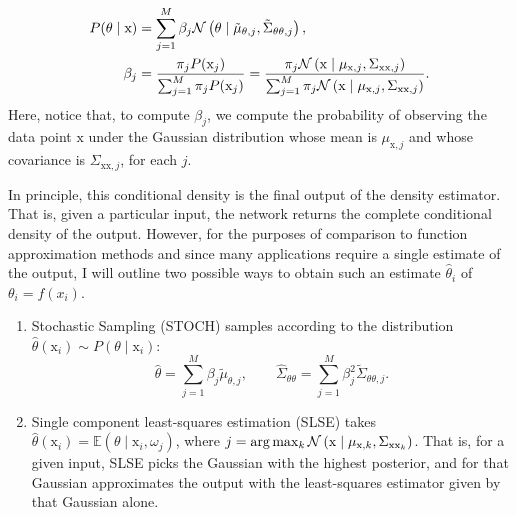 %
\begin{align}
    \begin{split}
    P(\theta \mid \mathrm{x}) &= \sum_{j=1}^M \beta_j \mathcal{N}\left(\theta \mid \tilde{\mu}_{\theta,j}, \tilde{\Sigma}_{\theta\theta,j} \right), \\
    \beta_j &= \frac{\pi_j P(\mathrm{x}_j)}{\sum_{j=1}^M \pi_j P(\mathrm{x}_j)} = 
    \frac{\pi_j \mathcal{N}\left(\mathrm{x} \mid {\mu}_{\mathrm{x},j}, {\Sigma}_{\mathrm{xx},j} \right)}
    {\sum_{j=1}^M \pi_j \mathcal{N}\left(\mathrm{x} \mid {\mu}_{\mathrm{x},j}, {\Sigma}_{\mathrm{xx},j} \right)}.
    \end{split}
    \label{eq:posterior_distribution}
\end{align}
%
Here, notice that, to compute $\beta_j$, we compute the probability of observing
the data point $\mathrm{x}$ under the Gaussian distribution whose mean is
$\mu_{\mathrm{x},j}$ and whose covariance is $\Sigma_{\mathrm{xx},j}$, for each
$j$.


In principle, this conditional density is the final output of the density
estimator. That is, given a particular input, the network returns the complete
conditional density of the output. However, for the purposes of comparison to
function approximation methods and since many applications require a single
estimate of the output, I will outline two possible ways to obtain such an
estimate $\hat{\theta}_i$ of $\theta_i = f(x_i)$.

\begin{enumerate}
    \item Stochastic Sampling (STOCH) samples according to the distribution
    $\hat{\theta}(\mathrm{x}_i) \sim P(\theta \mid \mathrm{x}_i)$:
    \begin{equation*}
        \hat{\theta} = \sum_{j=1}^M \beta_j \tilde{\mu}_{\theta,j}, \qquad
        \hat{\Sigma}_{\theta\theta} = \sum_{j=1}^M \beta_j^2 \tilde{\Sigma}_{\theta\theta,j}.
    \end{equation*}
    \item Single component least-squares estimation (SLSE) takes
    $\hat{\theta}(\mathrm{x}_i) = \mathbb{E}\left( \theta \mid \mathrm{x}_i,
    \omega_j \right)$, where $j = \arg \max_k \mathcal{N}\left(\mathrm{x} \mid
    \mu_{\mathrm{x},k}, \Sigma_{\mathrm{xx}_k}\right)$. That is, for a given input,
    SLSE picks the Gaussian with the highest posterior, and for that Gaussian
    approximates the output with the least-squares estimator given by that
    Gaussian alone.
\end{enumerate}


